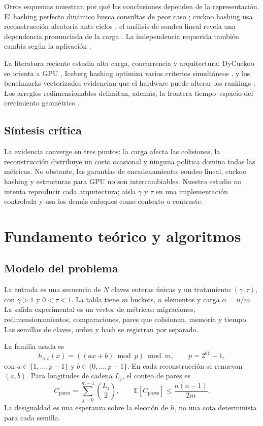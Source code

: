 \documentclass[11pt]{article}
\begin{document}
Otros esquemas muestran por qué las conclusiones dependen de la representación. El hashing perfecto dinámico busca consultas de peor caso \cite{DietzfelbingerEtAl1994}; cuckoo hashing usa reconstrucción aleatoria ante ciclos \cite{PaghRodler2004}; el análisis de sondeo lineal revela una dependencia pronunciada de la carga \cite{FlajoletPobleteViola1998}. La independencia requerida también cambia según la aplicación \cite{PatrascuThorup2012}.

La literatura reciente estudia alta carga, concurrencia y arquitectura: DyCuckoo se orienta a GPU \cite{LiEtAl2021}, Iceberg hashing optimiza varios criterios simultáneos \cite{BenderEtAl2023}, y los benchmarks vectorizados evidencian que el hardware puede alterar los rankings \cite{BoetherEtAl2023}. Los arreglos redimensionables delimitan, además, la frontera tiempo--espacio del crecimiento geométrico \cite{BrodnikEtAl1999,TarjanZwick2024}.

\subsection{Síntesis crítica}
La evidencia converge en tres puntos: la carga afecta las colisiones, la reconstrucción distribuye un costo ocasional y ninguna política domina todas las métricas. No obstante, las garantías de encadenamiento, sondeo lineal, cuckoo hashing y estructuras para GPU no son intercambiables. Nuestro estudio no intenta reproducir cada arquitectura; aísla $\gamma$ y $\tau$ en una implementación controlada y usa los demás enfoques como contexto o contraste.

\section{Fundamento teórico y algoritmos}
\subsection{Modelo del problema}
La entrada es una secuencia de $N$ claves enteras únicas y un tratamiento $(\gamma,\tau)$, con $\gamma>1$ y $0<\tau<1$. La tabla tiene $m$ buckets, $n$ elementos y carga $\alpha=n/m$. La salida experimental es un vector de métricas: migraciones, redimensionamientos, comparaciones, pares que colisionan, memoria y tiempo. Las semillas de claves, orden y hash se registran por separado.

La familia usada es
\[
h_{a,b}(x)=((ax+b)\bmod p)\bmod m,
\qquad p=2^{61}-1,
\]
con $a\in\{1,\ldots,p-1\}$ y $b\in\{0,\ldots,p-1\}$. En cada reconstrucción se renuevan $(a,b)$. Para longitudes de cadena $L_j$, el conteo de pares es
\[
C_{\mathrm{pares}}=\sum_{j=0}^{m-1}\binom{L_j}{2},
\qquad
\mathbb{E}[C_{\mathrm{pares}}]\le \frac{n(n-1)}{2m}.
\]
La desigualdad es una esperanza sobre la elección de $h$, no una cota determinista para cada semilla.
\end{document}
